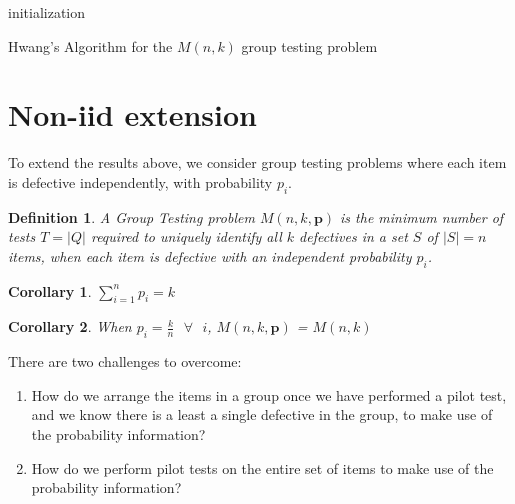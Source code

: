 \documentclass{article}
\renewcommand{\vec}[1]{\mathbf{#1}}
\newtheorem{definition}{Definition}[section]
\newtheorem{cor}{Corollary}[section]
\begin{document}
\bigskip	
\begin{algorithm}[H]
 \SetLine %
 initialization\;
 \caption{Hwang's Algorithm for the \(M\left(n,k\right)\) group testing problem}
\end{algorithm}
\bigskip	

\section{Non-iid extension}

To extend the results above, we consider group testing problems where each item is defective independently, with probability \(p_i\). 

\begin{definition}
A Group Testing problem \( M\left(n,k,\vec{p}\right) \) is the minimum number of tests \(T = \lvert Q \rvert\) required to uniquely identify all \(k\) defectives in a set \(S\) of \(\lvert S \rvert = n \) items, when each item is defective with an independent probability \(p_i\).
\end{definition}

\begin{cor}
\(\sum_{i=1}^n p_i = k\)
\end{cor}

\begin{cor}
When \(p_i = \frac{k}{n} \text{ } \forall \text{ } i\), \( M\left(n,k,\vec{p}\right) \) = \( M\left(n,k\right) \)
\end{cor}
There are two challenges to overcome: 

\begin{enumerate}
\item How do we arrange the items in a group once we have performed a pilot test, and we know there is a least a single defective in the group, to make use of the probability information?
\item How do we perform pilot tests on the entire set of items to make use of the probability information?
\end{enumerate}
\end{document}
